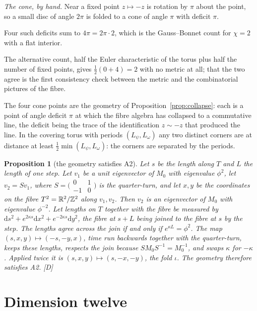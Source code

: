 \documentclass[11pt,a4paper]{article}
\theoremstyle{plain}
\newtheorem{proposition}[theorem]{Proposition}
\theoremstyle{definition}
\theoremstyle{remark}
\newcommand{\rigD}{[\textup{D}]}
\begin{document}
\emph{The cone, by hand.} Near a fixed point $z\mapsto-z$ is rotation by $\pi$ about the point, so a small disc of angle $2\pi$ is folded to a cone of angle $\pi$ with deficit $\pi$.

Four such deficits sum to $4\pi=2\pi\cdot2$, which is the Gauss--Bonnet count for $\chi=2$ with a flat interior.

The alternative count, half the Euler characteristic of the torus plus half the number of fixed points, gives $\tfrac12(0+4)=2$ with no metric at all; that the two agree is the first consistency check between the metric and the combinatorial pictures of the fibre.

The four cone points are the geometry of Proposition~\ref{prop:collapse}: each is a point of angle deficit $\pi$ at which the fibre algebra has collapsed to a commutative line, the deficit being the trace of the identification $z\sim-z$ that produced the line. In the covering torus with periods $(L_{\psi},L_{\omega})$ any two distinct corners are at distance at least $\tfrac12\min(L_{\psi},L_{\omega})$: the corners are separated by the periods.

\begin{proposition}[the geometry satisfies A2]\label{prop:A2}
Let $s$ be the length along $T$ and $L$ the length of one step. Let $v_{1}$ be a unit eigenvector of $M_{0}$ with eigenvalue $\phi^{2}$, let $v_{2}=Sv_{1}$, where $S=\bigl(\begin{smallmatrix}0&1\\-1&0\end{smallmatrix}\bigr)$ is the quarter-turn, and let $x,y$ be the coordinates on the fibre $T^2=\mathbb{R}^{2}/\mathbb{Z}^{2}$ along $v_{1},v_{2}$. Then $v_{2}$ is an eigenvector of $M_{0}$ with eigenvalue $\phi^{-2}$. Let lengths on $T$ together with the fibre be measured by $\mathrm{d}s^{2}+e^{2\kappa s}\mathrm{d}x^{2}+e^{-2\kappa s}\mathrm{d}y^{2}$, the fibre at $s+L$ being joined to the fibre at $s$ by the step. The lengths agree across the join if and only if $e^{\kappa L}=\phi^{2}$. The map $(s,x,y)\mapsto(-s,-y,x)$, time run backwards together with the quarter-turn, keeps these lengths, respects the join because $SM_{0}S^{-1}=M_{0}^{-1}$, and swaps $\kappa$ for $-\kappa$. Applied twice it is $(s,x,y)\mapsto(s,-x,-y)$, the fold $\iota$. The geometry therefore satisfies A2. \rigD
\end{proposition}

\section{Dimension twelve}\label{sec:dimension}
\end{document}
